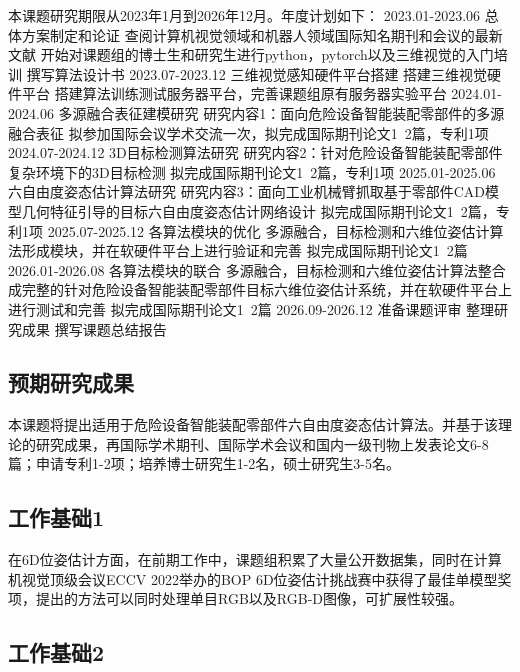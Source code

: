 \documentclass[12pt]{article}
\begin{document}
本课题研究期限从2023年1月到2026年12月。年度计划如下：
2023.01-2023.06		总体方案制定和论证
查阅计算机视觉领域和机器人领域国际知名期刊和会议的最新文献
开始对课题组的博士生和研究生进行python，pytorch以及三维视觉的入门培训
撰写算法设计书
2023.07-2023.12		三维视觉感知硬件平台搭建
搭建三维视觉硬件平台
搭建算法训练测试服务器平台，完善课题组原有服务器实验平台
2024.01-2024.06		多源融合表征建模研究
研究内容1：面向危险设备智能装配零部件的多源融合表征
拟参加国际会议学术交流一次，拟完成国际期刊论文1~2篇，专利1项
2024.07-2024.12		3D目标检测算法研究
研究内容2：针对危险设备智能装配零部件复杂环境下的3D目标检测
拟完成国际期刊论文1~2篇，专利1项
2025.01-2025.06		六自由度姿态估计算法研究
研究内容3：面向工业机械臂抓取基于零部件CAD模型几何特征引导的目标六自由度姿态估计网络设计
拟完成国际期刊论文1~2篇，专利1项
2025.07-2025.12		各算法模块的优化
多源融合，目标检测和六维位姿估计算法形成模块，并在软硬件平台上进行验证和完善
拟完成国际期刊论文1~2篇
2026.01-2026.08		各算法模块的联合
多源融合，目标检测和六维位姿估计算法整合成完整的针对危险设备智能装配零部件目标六维位姿估计系统，并在软硬件平台上进行测试和完善
拟完成国际期刊论文1~2篇
2026.09-2026.12		准备课题评审
整理研究成果
撰写课题总结报告

\subsection{预期研究成果}

本课题将提出适用于危险设备智能装配零部件六自由度姿态估计算法。并基于该理论的研究成果，再国际学术期刊、国际学术会议和国内一级刊物上发表论文6-8篇；申请专利1-2项；培养博士研究生1-2名，硕士研究生3-5名。





\subsection{工作基础1}

在6D位姿估计方面，在前期工作中，课题组积累了大量公开数据集，同时在计算机视觉顶级会议ECCV 2022举办的BOP 6D位姿估计挑战赛中获得了最佳单模型奖项，提出的方法可以同时处理单目RGB以及RGB-D图像，可扩展性较强。

\subsection{工作基础2}
\end{document}
